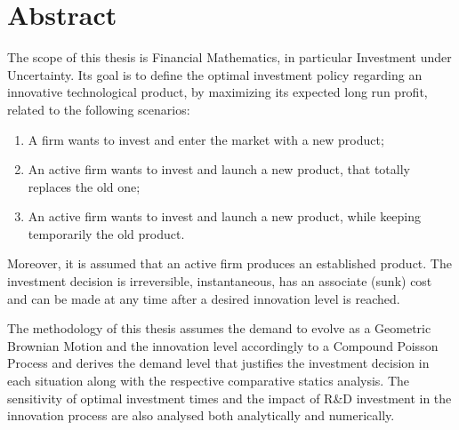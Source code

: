 
\section*{Abstract}


The scope of this thesis is Financial Mathematics, in particular Investment under Uncertainty.
Its goal is to define the optimal investment policy regarding an innovative technological product, by maximizing its expected long run profit, related to
the following scenarios:
\begin{enumerate}
	\item A firm wants to invest and enter the market with a new product;
	\item An active firm wants to invest and launch a new product, that totally replaces the old one; 
	\item An active firm wants to invest and launch a new product, while keeping temporarily the old product.
\end{enumerate}

Moreover,
it is assumed  that an active firm produces an established product. The investment decision is irreversible, instantaneous, has an associate (sunk) cost and can be made at any time after a desired innovation level is reached.

The methodology of this thesis assumes the demand to evolve as a Geometric Brownian Motion and the innovation level accordingly to a Compound Poisson Process and derives the demand level that justifies the investment decision in each situation along with the respective comparative statics analysis. The sensitivity of optimal investment times and the impact of R\&D investment in the innovation process are also analysed both analytically and numerically.

